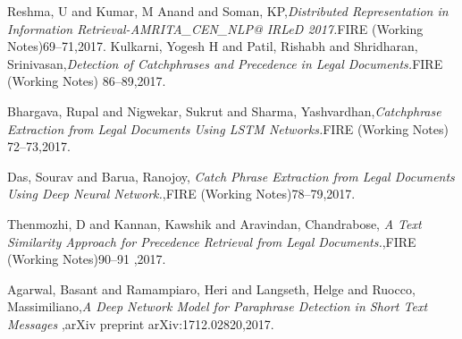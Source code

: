 \documentclass[12pt,a4paper]{article}
\begin{document}
\begin{thebibliography}{99}
	
	
	Reshma, U and Kumar, M Anand and Soman, KP,{\em Distributed Representation in Information Retrieval-AMRITA\_CEN\_NLP@ IRLeD 2017.}FIRE (Working Notes)69--71,2017.	
	Kulkarni, Yogesh H and Patil, Rishabh and Shridharan, Srinivasan,{\em Detection of Catchphrases and Precedence in Legal Documents.}FIRE (Working Notes) 86--89,2017.
	
	Bhargava, Rupal and Nigwekar, Sukrut and Sharma, Yashvardhan,{\em Catchphrase Extraction from Legal Documents Using LSTM Networks.}FIRE (Working Notes) 72--73,2017.
	
	Das, Sourav and Barua, Ranojoy, {\em Catch Phrase Extraction from Legal Documents Using Deep Neural Network.},FIRE (Working Notes)78--79,2017.
	
	 Thenmozhi, D and Kannan, Kawshik and Aravindan, Chandrabose, {\em A Text Similarity Approach for Precedence Retrieval from Legal Documents.},FIRE (Working Notes)90--91 ,2017.
	
	Agarwal, Basant and Ramampiaro, Heri and Langseth, Helge and Ruocco, Massimiliano,{\em A Deep Network Model for Paraphrase Detection in Short Text Messages} ,arXiv preprint arXiv:1712.02820,2017.
	
\end{thebibliography}




	
\end{document}
